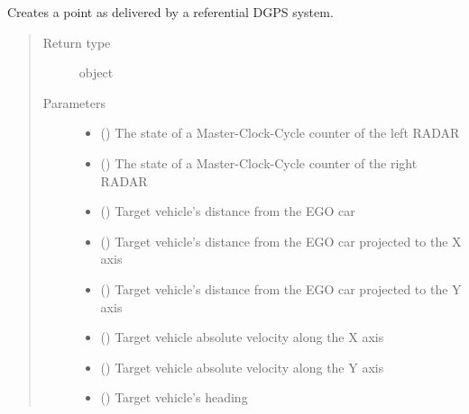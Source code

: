 \documentclass[letterpaper,10pt,english]{Reference manual}
\begin{document}
\begin{fulllineitems}
\label{\detokenize{datacontainers:data_containers.ReferencePoint}}
Creates a point as delivered by a referential DGPS system.
\begin{quote}\begin{description}
\item[{Return type}] \leavevmode
object

\item[{Parameters}] \leavevmode\begin{itemize}
\item {} 
 () \textendash{} The state of a Master-Clock-Cycle counter of the left RADAR

\item {} 
 () \textendash{} The state of a Master-Clock-Cycle counter of the right RADAR

\item {} 
 () \textendash{} Target vehicle’s distance from the EGO car

\item {} 
 () \textendash{} Target vehicle’s distance from the EGO car projected to the X axis

\item {} 
 () \textendash{} Target vehicle’s distance from the EGO car projected to the Y axis

\item {} 
 () \textendash{} Target vehicle absolute velocity along the X axis

\item {} 
 () \textendash{} Target vehicle absolute velocity along the Y axis

\item {} 
 () \textendash{} Target vehicle’s heading


\end{itemize}
\end{description}
\end{quote}
\end{fulllineitems}
\end{document}
